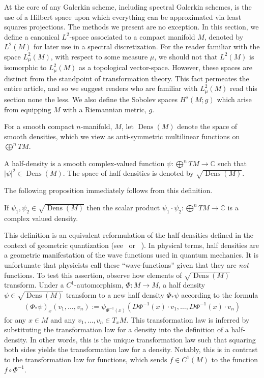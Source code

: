 \documentclass[final,leqno]{siamart}
\DeclareMathOperator{\Dens}{Dens}
\begin{document}
At the core of any Galerkin scheme, including spectral Galerkin schemes, is the use of a Hilbert space upon which everything can be approximated via least squares projections.
The methods we present are no exception.
In this section, we define a canonical $L^{2}$-space associated to a compact manifold $M$, denoted by $L^{2}(M)$ for later use in a spectral discretization.
For the reader familiar with the space $L^{2}_{\mu}(M)$, with respect to some measure $\mu$, we should not that $L^{2}(M)$ is isomorphic to $L^{2}_{\mu}(M)$ as a topological vector-space.
However, these spaces are distinct from the standpoint of transformation theory.
This fact permeates the entire article, and so we suggest readers who are familiar with $L^{2}_{\mu}(M)$ read this section none the less.
We also define the Sobolev spaces $H^{s}(M ; g)$ which arise from equipping $M$ with a Riemannian metric, $g$.

For a smooth compact $n$-manifold, $M$, let $\Dens(M)$ denote the space of smooth densities, which we view as anti-symmetric multilinear functions on $\bigoplus^n TM$.
\begin{definition}\label{def:half density}
	A half-density is a smooth complex-valued function $\psi : \bigoplus^n TM \to \mathbb{C}$
	such that $| \psi |^{2} \in \Dens(M)$.
	The space of half densities is denoted by $\sqrt{\Dens(M)}$.
\end{definition}

The following proposition immediately follows from this definition.
\begin{proposition} \label{prop:half densities}
	If $\psi_{1}, \psi_{2} \in \sqrt{\Dens(M)}$ then the scalar product $\psi_{1} \cdot \psi_{2} : \bigoplus^{n} TM \to \mathbb{C}$ is a complex valued density. 
\end{proposition}

This definition is an equivalent reformulation of the half densities defined in the context of geometric quantization (see~\cite[Chapter 4]{GuilleminSternberg1970} or ~\cite[Appendix A]{BatesWeinstein1997}).
In physical terms, half densities are a geometric manifestation of the wave functions used in quantum mechanics.
It is unfortunate that physicists call these ``wave-functions'' given that they are \emph{not} functions.
To test this assertion, observe how elements of $\sqrt{\Dens(M)}$ transform.
Under a $C^{1}$-automorphism, $\Phi: M \to M$, a half density $\psi \in \sqrt{ \Dens(M) }$ transform to a new half density $\Phi_{*}\psi$ according to the formula
\begin{align}
	(\Phi_{*}\psi)_{x}(v_{1},\dots,v_{n}) := \psi_{ \Phi^{-1}(x) } ( D\Phi^{-1}(x) \cdot v_{1} , \dots , D\Phi^{-1}(x) \cdot v_{n} ) \label{eq:transformation law}
\end{align}
for any $x \in M$ and any $v_{1}, \dots , v_{n} \in T_{x}M$.
This transformation law is inferred by substituting the transformation law for a density into the definition of a half-density.
In other words, this is the unique transformation law such that squaring both sides yields the transformation law for a density.
Notably, this is in contrast to the transformation law for functions, which sends $f \in C^{1}(M)$ to the function $f \circ \Phi^{-1}$.
\end{document}
